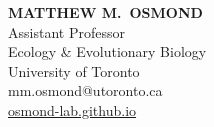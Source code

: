 \documentclass[12pt]{article}
\begin{document}
\thispagestyle{empty} 
\pagestyle{fancy}

{\raggedleft
\noindent\Large{\textbf{MATTHEW M.\ OSMOND}}\\
\large Assistant Professor\\
\large Ecology \& Evolutionary Biology\\
\large University of Toronto \\
\large mm.osmond@utoronto.ca\\
\href{https:/osmond-lab.github.io}{osmond-lab.github.io}\\
}

\section*{}
\end{document}
